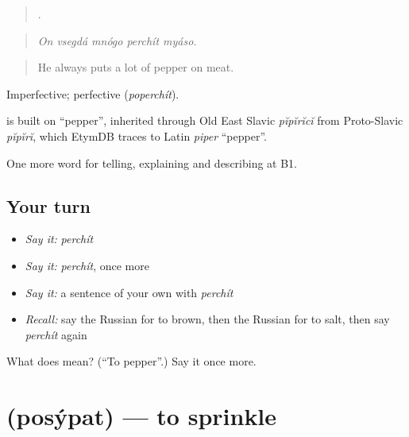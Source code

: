 \begin{quote}
    .
\end{quote}

\begin{quote}
\emph{On vsegdá mnógo perchít myáso.}
\end{quote}

\begin{quote}
He always puts a lot of pepper on meat.
\end{quote}

Imperfective; perfective \emph{} (\emph{poperchít}).

\begin{cousinweb}
\emph{} is built on \emph{} \textquotedblleft{}pepper\textquotedblright{}, inherited through Old East Slavic \emph{pĭpĭrĭcĭ} from Proto-Slavic \emph{pĭpĭrĭ}, which EtymDB traces to Latin \emph{piper} \textquotedblleft{}pepper\textquotedblright{}.
\end{cousinweb}

\begin{grammarlens}[title={What you've built}]
One more word for telling, explaining and describing at B1.
\end{grammarlens}

\subsection*{Your turn}
\begin{itemize}
\raggedright
  \item \emph{Say it:} \emph{perchít}
  \item \emph{Say it:} \emph{perchít}, once more
  \item \emph{Say it:} a sentence of your own with \emph{perchít}
  \item \emph{Recall:} say the Russian for to brown, then the Russian for to salt, then say \emph{perchít} again
\end{itemize}

\begin{tcolorbox}[breakable,colback=teal!4,colframe=teal!35!black,title={Before you move on}]
What does  mean? (\textquotedblleft{}To pepper\textquotedblright{}.) Say it once more.
\end{tcolorbox}
\section[\texorpdfstring{\ru{посыпать} (posýpat)}{посыпать (posýpat)}]{ (posýpat) — to sprinkle}


